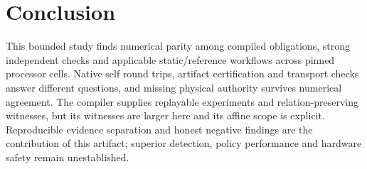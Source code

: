 \section{Conclusion}
This bounded study finds numerical parity among compiled obligations, strong independent checks and applicable static/reference workflows across pinned processor cells. Native self round trips, artifact certification and transport checks answer different questions, and missing physical authority survives numerical agreement. The compiler supplies replayable experiments and relation-preserving witnesses, but its witnesses are larger here and its affine scope is explicit. Reproducible evidence separation and honest negative findings are the contribution of this artifact; superior detection, policy performance and hardware safety remain unestablished.
